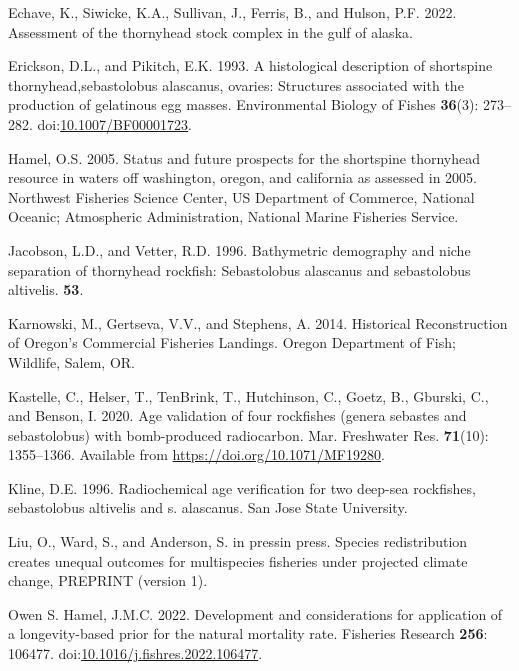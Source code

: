 \documentclass[11pt,
  english,
  letterpaper,
]{article}
\newlength{\cslhangindent}
\newenvironment{CSLReferences}[2] %
 {%
  \setlength{\parindent}{0pt}
  \ifodd #1 \everypar{\setlength{\hangindent}{\cslhangindent}}\ignorespaces\fi
  \ifnum #2 > 0
  \setlength{\parskip}{#2\baselineskip}
  \fi
 }%
 {}
\begin{document}
\begin{CSLReferences}{1}{0}
\leavevmode{}%
Echave, K., Siwicke, K.A., Sullivan, J., Ferris, B., and Hulson, P.F. 2022. Assessment of the thornyhead stock complex in the gulf of alaska.

\leavevmode{}%
Erickson, D.L., and Pikitch, E.K. 1993. A histological description of shortspine thornyhead,sebastolobus alascanus, ovaries: Structures associated with the production of gelatinous egg masses. Environmental Biology of Fishes \textbf{36}(3): 273--282. doi:\href{https://doi.org/10.1007/BF00001723}{10.1007/BF00001723}.

\leavevmode{}%
Hamel, O.S. 2005. Status and future prospects for the shortspine thornyhead resource in waters off washington, oregon, and california as assessed in 2005. Northwest Fisheries Science Center, US Department of Commerce, National Oceanic; Atmospheric Administration, National Marine Fisheries Service.

\leavevmode{}%
Jacobson, L.D., and Vetter, R.D. 1996. Bathymetric demography and niche separation of thornyhead rockfish: Sebastolobus alascanus and sebastolobus altivelis. \textbf{53}.

\leavevmode{}%
Karnowski, M., Gertseva, V.V., and Stephens, A. 2014. Historical {Reconstruction} of {Oregon}'s {Commercial} {Fisheries} {Landings}. Oregon Department of Fish; Wildlife, Salem, OR.

\leavevmode{}%
Kastelle, C., Helser, T., TenBrink, T., Hutchinson, C., Goetz, B., Gburski, C., and Benson, I. 2020. Age validation of four rockfishes (genera sebastes and sebastolobus) with bomb-produced radiocarbon. Mar. Freshwater Res. \textbf{71}(10): 1355--1366. Available from \url{https://doi.org/10.1071/MF19280}.

\leavevmode{}%
Kline, D.E. 1996. Radiochemical age verification for two deep-sea rockfishes, sebastolobus altivelis and s. alascanus. San Jose State University.

\leavevmode{}%
Liu, O., Ward, S., and Anderson, S. in pressin press. Species redistribution creates unequal outcomes for multispecies fisheries under projected climate change, PREPRINT (version 1).

\leavevmode{}%
Owen S. Hamel, J.M.C. 2022. Development and considerations for application of a longevity-based prior for the natural mortality rate. Fisheries Research \textbf{256}: 106477. doi:\href{https://doi.org/10.1016/j.fishres.2022.106477}{10.1016/j.fishres.2022.106477}.


\end{CSLReferences}
\end{document}
